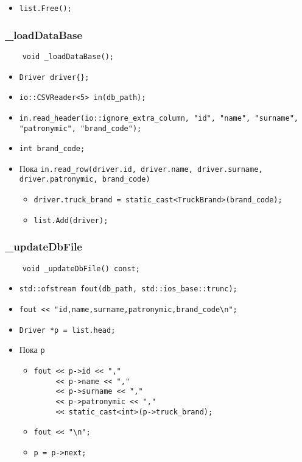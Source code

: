 \begin{itemize}
    \item \verb|list.Free();|
\end{itemize}

\subsubsection{\_loadDataBase}

\begin{lstlisting}
    void _loadDataBase();
\end{lstlisting}

\begin{itemize}
    \item \verb|Driver driver{};|
    \item \verb|io::CSVReader<5> in(db_path);|
    \item \verb|in.read_header(io::ignore_extra_column, "id", "name", "surname", "patronymic", "brand_code");|
    \item \verb|int brand_code;|
    \item Пока \verb|in.read_row(driver.id, driver.name, driver.surname, driver.patronymic, brand_code)|
        \begin{itemize}
            \item \verb|driver.truck_brand = static_cast<TruckBrand>(brand_code);|
            \item \verb|list.Add(driver);|
        \end{itemize}
\end{itemize}

\subsubsection{\_updateDbFile}

\begin{lstlisting}
    void _updateDbFile() const;
\end{lstlisting}

\begin{itemize}
    \item \verb|std::ofstream fout(db_path, std::ios_base::trunc);|
    \item \verb|fout << "id,name,surname,patronymic,brand_code\n";|
    \item \verb|Driver *p = list.head;|
    \item Пока \verb|p|
        \begin{itemize}
            \item 
            \verb|fout << p->id << ","|\\
            \verb|     << p->name << ","|\\
            \verb|     << p->surname << ","|\\
            \verb|     << p->patronymic << ","|\\
            \verb|     << static_cast<int>(p->truck_brand);|
            \item \verb|fout << "\n";|
            \item \verb|p = p->next;|
        \end{itemize}
\end{itemize}

